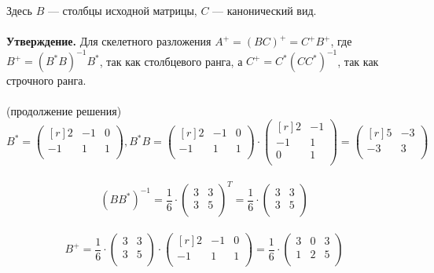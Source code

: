 \documentclass[12pt]{article}
\theoremstyle{definition}
\numberwithin{equation}{section}
\begin{document}
Здесь $B$ --- столбцы исходной матрицы, $C$ --- канонический вид.\\ \\
\textbf{Утверждение.}
Для скелетного разложения $A^+=(BC)^+=C^+B^+$, где 
$B^+=(B^*B)^{-1}B^*$, так как столбцевого ранга, а
$C^+=C^*(CC^*)^{-1}$, так как строчного ранга.\\ \\
(продолжение решения)
\[B^* = \begin{pmatrix}[r]
2 & -1 & 0 \\         
-1 & 1 & 1 \\
\end{pmatrix}, B^*B = \begin{pmatrix}[r]
2 & -1 & 0 \\         
-1 & 1 & 1 \\
\end{pmatrix} \cdot \begin{pmatrix}[r]
2 & -1 \\         
-1 & 1 \\
0 & 1 \\
\end{pmatrix} = \begin{pmatrix}[r]
5 & -3 \\         
-3 & 3 \\
\end{pmatrix}\]\\
\[(BB^*)^{-1} = \frac{1}{6} \cdot \begin{pmatrix}
3 & 3 \\         
3 & 5 \\
\end{pmatrix}^T = \frac{1}{6} \cdot \begin{pmatrix}
3 & 3 \\         
3 & 5 \\
\end{pmatrix}\]\\
\[B^+ = \frac{1}{6} \cdot \begin{pmatrix}
3 & 3 \\         
3 & 5 \\
\end{pmatrix} \cdot \begin{pmatrix}[r]
2 & -1 & 0 \\         
-1 & 1 & 1 \\
\end{pmatrix} = \frac{1}{6} \cdot \begin{pmatrix}
3 & 0 & 3 \\         
1 & 2 & 5 \\
\end{pmatrix}\]\\
\end{document}
